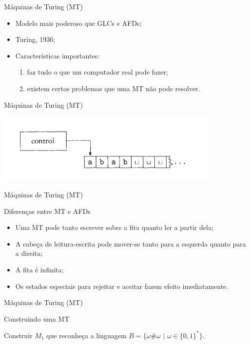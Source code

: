 \documentclass[xcolor=dvipsnames,table]{beamer}
\begin{document}
\begin{frame}{Máquinas de Turing (MT)}
	\begin{itemize}
		\item Modelo mais poderoso que GLCs e AFDs; \pause
		\item Turing, 1936; \pause
		\item Características importantes:
		\begin{enumerate}
			\item faz tudo o que um computador real pode fazer;
			\item existem certos problemas que uma MT não pode resolver.
		\end{enumerate}				 
	\end{itemize}
\end{frame}
	
	\begin{frame}{Máquinas de Turing (MT)}
		\begin{center}
			\includegraphics[height=3.5cm]{images/fig31.png}
		\end{center}
	\end{frame}
	
	\begin{frame}{Máquinas de Turing (MT)}
		\begin{block}{Diferenças entre MT e AFDs}
			\begin{itemize}
				\item Uma MT pode tanto escrever sobre a fita quanto ler a partir dela; \pause
				\item A cabeça de leitura-escrita pode mover-se tanto para a esquerda quanto para a direita; \pause
				\item A fita é infinita; \pause
				\item Os estados especiais para rejeitar e aceitar fazem efeito imediatamente.
			\end{itemize}
		\end{block}
	\end{frame}
	
	\begin{frame}{Máquinas de Turing (MT)}
		\begin{block}{Construindo uma MT}
			\begin{center}
				Construir $M_1$ que reconheça a linguagem $B = \{ \omega \# \omega \mbox{ | } \omega \in \{ 0, 1 \}^* \}$.
			\end{center}
		\end{block}
	\end{frame}
	
\end{document}
